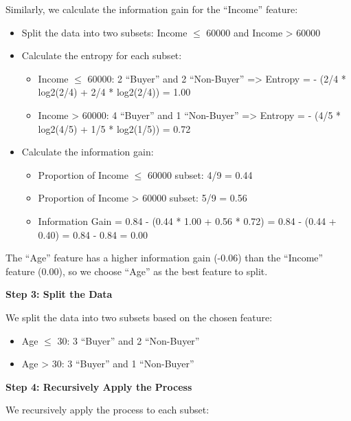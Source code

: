 \documentclass[12pt]{book}
\providecommand{\tightlist}{%
  \setlength{\itemsep}{0pt}\setlength{\parskip}{0pt}}
\begin{document}
Similarly, we calculate the information gain for the ``Income'' feature:

\begin{itemize}
\tightlist
\item
  Split the data into two subsets: Income \(\le\) 60000 and Income
  \textgreater{} 60000
\item
  Calculate the entropy for each subset:

  \begin{itemize}
  \tightlist
  \item
    Income \(\le\) 60000: 2 ``Buyer'' and 2 ``Non-Buyer'' =\textgreater{}
    Entropy = - (2/4 * log2(2/4) + 2/4 * log2(2/4)) = 1.00
  \item
    Income \textgreater{} 60000: 4 ``Buyer'' and 1 ``Non-Buyer''
    =\textgreater{} Entropy = - (4/5 * log2(4/5) + 1/5 * log2(1/5)) =
    0.72
  \end{itemize}
\item
  Calculate the information gain:

  \begin{itemize}
  \tightlist
  \item
    Proportion of Income \(\le\) 60000 subset: 4/9 = 0.44
  \item
    Proportion of Income \textgreater{} 60000 subset: 5/9 = 0.56
  \item
    Information Gain = 0.84 - (0.44 * 1.00 + 0.56 * 0.72) = 0.84 - (0.44
    + 0.40) = 0.84 - 0.84 = 0.00
  \end{itemize}
\end{itemize}

The ``Age'' feature has a higher information gain (-0.06) than the
``Income'' feature (0.00), so we choose ``Age'' as the best feature to
split.

\textbf{Step 3: Split the Data}

We split the data into two subsets based on the chosen feature:

\begin{itemize}
\tightlist
\item
  Age \(\le\) 30: 3 ``Buyer'' and 2 ``Non-Buyer''
\item
  Age \textgreater{} 30: 3 ``Buyer'' and 1 ``Non-Buyer''
\end{itemize}

\textbf{Step 4: Recursively Apply the Process}

We recursively apply the process to each subset:
\end{document}
